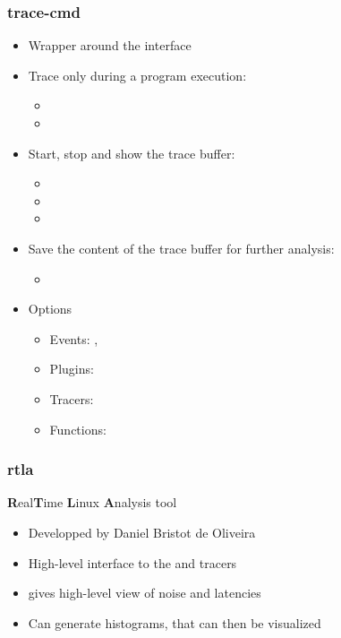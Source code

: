 \begin{frame}
	\frametitle{trace-cmd}
	\begin{itemize}
		\item Wrapper around the  interface
		\item Trace only during a program execution:
			\begin{itemize}
				\item {}
				\item {}
			\end{itemize}
		\item Start, stop and show the trace buffer:
			\begin{itemize}
				\item {}
				\item {}
				\item {}
			\end{itemize}
		\item Save the content of the trace buffer for further analysis:
			\begin{itemize}
				\item {}
			\end{itemize}
		\item Options
			\begin{itemize}
				\item Events: , 
				\item Plugins: 
				\item Tracers: 
				\item Functions: 
			\end{itemize}
	\end{itemize}
\end{frame}

\begin{frame}
	\frametitle{rtla}
	\textbf{R}eal\textbf{T}ime \textbf{L}inux \textbf{A}nalysis tool
	\begin{itemize}
		\item Developped by Daniel Bristot de Oliveira
		\item High-level interface to the  and  tracers
		\item {} gives high-level view of noise and latencies
		\item Can generate histograms, that can then be visualized
	\end{itemize}

\end{frame}

